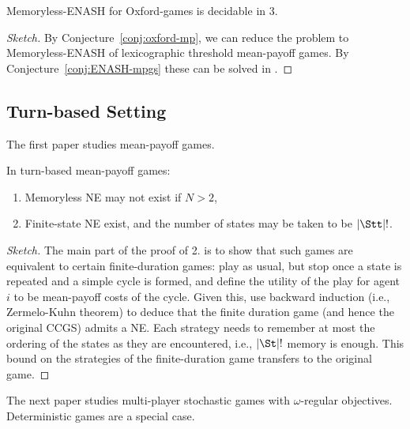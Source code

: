  \begin{conjecture}
  Memoryless-ENASH for Oxford-games is decidable in 3\exptime.
 \end{conjecture}
\begin{proof}[Sketch]
 By Conjecture~\ref{conj:oxford-mp}, we can reduce the problem to Memoryless-ENASH of lexicographic threshold mean-payoff games. By Conjecture~\ref{conj:ENASH-mpgs}
 these can be solved in \exptime.
\end{proof}




\subsection{Turn-based Setting}

The first paper studies mean-payoff games.

\begin{theorem} \label{thm:turnbased:MP}
In turn-based mean-payoff games:
\begin{enumerate}
 \item Memoryless NE may not exist if $N > 2$, 
 \item Finite-state NE exist, and the number of states may be taken to be $|\Stt|!$. 
\end{enumerate}
\end{theorem}
\begin{proof}[Sketch]
The main part of the proof of 2. is to show that such games are equivalent to certain 
finite-duration games: play as usual, but stop once a state is repeated and a 
simple cycle is formed, and define the utility of the play for agent $i$ to be 
mean-payoff costs of the cycle.  Given this, use backward induction (i.e., 
Zermelo-Kuhn theorem) to deduce that the finite duration game (and hence the 
original CCGS) admits a NE. Each strategy needs to remember at most the ordering 
of the states as they are encountered, i.e., $|\St|!$ memory is enough. This 
bound on the strategies of the finite-duration game transfers to the original 
game. 
\end{proof}

The next paper studies multi-player stochastic games with $\omega$-regular objectives.
Deterministic games are a special case.

